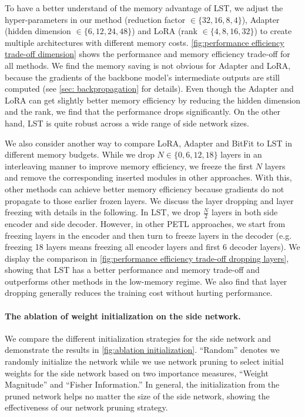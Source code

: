 To have a better understand of the memory advantage of LST, we adjust the hyper-parameters in our method (reduction factor $\in \{32, 16, 8, 4\}$), Adapter (hidden dimension $\in \{6, 12, 24, 48\}$) and LoRA (rank $\in \{4, 8, 16, 32\}$) to create multiple architectures with different memory costs. \ref{fig:performance efficiency trade-off dimension} shows the performance and memory efficiency trade-off for all methods. We find the memory saving is not obvious for Adapter and LoRA, because the gradients of the backbone model's intermediate outputs are still computed (see \ref{sec: backpropagation} for details). Even though the Adapter and LoRA can get slightly better memory efficiency by reducing the hidden dimension and the rank, we find that the performance drops significantly. On the other hand, LST is quite robust across a wide range of side network sizes.

We also consider another way to compare LoRA, Adapter and BitFit to LST in different memory budgets. While we drop $N \in \{0, 6, 12, 18\}$ layers in an interleaving manner to improve memory efficiency, we freeze the first $N$ layers and remove the corresponding inserted modules in other approaches. With this, other methods can achieve better memory efficiency because gradients do not propagate to those earlier frozen layers. We discuss the layer dropping and layer freezing with details in the following. In LST, we drop $\frac{N}{2}$ layers in both side encoder and side decoder. However, in other PETL approaches, we start from freezing layers in the encoder and then turn to freeze layers in the decoder (e.g. freezing 18 layers means freezing all encoder layers and first 6 decoder layers). We display the comparison in \ref{fig:performance efficiency trade-off dropping layers}, showing that LST has a better performance and memory trade-off and outperforms other methods in the low-memory regime. We also find that layer dropping generally reduces the training cost without hurting performance.

\paragraph{The ablation of weight initialization on the side network.} We compare the different initialization strategies for the side network and demonstrate the results in \ref{fig:ablation initialization}. ``Random'' denotes we randomly initialize the network while we use network pruning to select initial weights for the side network based on two importance measures, ``Weight Magnitude'' and ``Fisher Information.'' In general, the initialization from the pruned network helps no matter the size of the side network, showing the effectiveness of our network pruning strategy.

